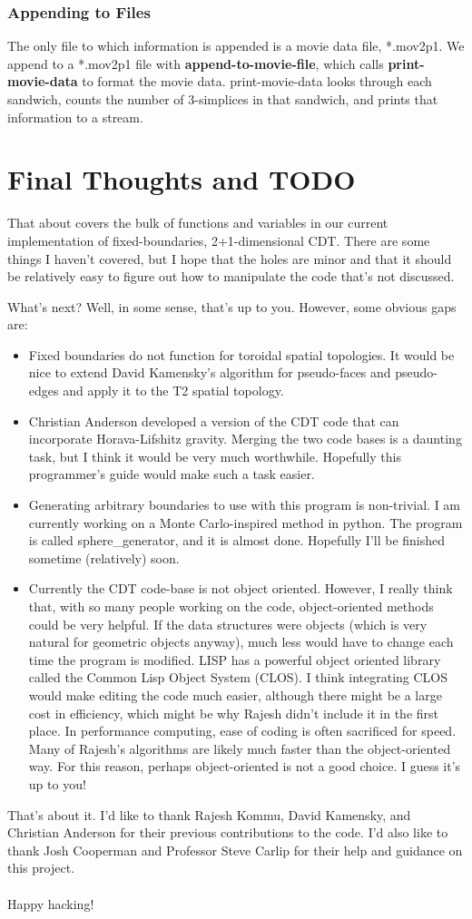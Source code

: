 \documentclass[12pt]{article}
\begin{document}
\subsubsection{Appending to Files}
\label{sec:output:appending-to-files}

The only file to which information is appended is a movie data file,
*.mov2p1. We append to a *.mov2p1 file with
\textbf{append-to-movie-file}, which calls \textbf{print-movie-data}
to format the movie data. print-movie-data looks through each
sandwich, counts the number of 3-simplices in that sandwich, and
prints that information to a stream. 

\section{Final Thoughts and TODO}

That about covers the bulk of functions and variables in our current
implementation of fixed-boundaries, 2+1-dimensional CDT. There are
some things I haven't covered, but I hope that the holes are minor and
that it should be relatively easy to figure out how to manipulate the
code that's not discussed.

What's next? Well, in some sense, that's up to you. However, some
obvious gaps are:
\begin{itemize}
\item Fixed boundaries do not function for toroidal spatial
  topologies. It would be nice to extend David Kamensky's algorithm
  for pseudo-faces and pseudo-edges and apply it to the T2 spatial
  topology.
\item Christian Anderson developed a version of the CDT code that can
  incorporate Horava-Lifshitz gravity. Merging the two code bases is a
  daunting task, but I think it would be very much
  worthwhile. Hopefully this programmer's guide would make such a task
  easier.
\item Generating arbitrary boundaries to use with this program is
  non-trivial. I am currently working on a Monte Carlo-inspired method
  in python. The program is called sphere\_generator, and it is almost
  done. Hopefully I'll be finished sometime (relatively) soon.
\item Currently the CDT code-base is not object oriented. However, I
  really think that, with so many people working on the code,
  object-oriented methods could be very helpful. If the data
  structures were objects (which is very natural for geometric objects
  anyway), much less would have to change each time the program is
  modified. LISP has a powerful object oriented library called the
  Common Lisp Object System (CLOS). I think integrating CLOS would
  make editing the code much easier, although there might be a large
  cost in efficiency, which might be why Rajesh didn't include it in
  the first place. In performance computing, ease of coding is often
  sacrificed for speed. Many of Rajesh's algorithms are likely much
  faster than the object-oriented way. For this reason, perhaps
  object-oriented is not a good choice. I guess it's up to you!
\end{itemize}

That's about it. I'd like to thank Rajesh Kommu, David Kamensky, and
Christian Anderson for their previous contributions to the code. I'd
also like to thank Josh Cooperman and Professor Steve Carlip for their
help and guidance on this project.\\
\\
Happy hacking!
\end{document}
